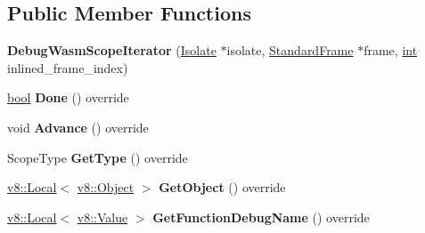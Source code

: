 \subsection*{Public Member Functions}
\begin{DoxyCompactItemize}
\item 
\mbox{\label{classv8_1_1internal_1_1DebugWasmScopeIterator_a8f3a1a31651d144344c15e9bd7116ba0}} 
{\bfseries Debug\+Wasm\+Scope\+Iterator} (\mbox{\hyperlink{classv8_1_1internal_1_1Isolate}{Isolate}} $\ast$isolate, \mbox{\hyperlink{classv8_1_1internal_1_1StandardFrame}{Standard\+Frame}} $\ast$frame, \mbox{\hyperlink{classint}{int}} inlined\+\_\+frame\+\_\+index)
\item 
\mbox{\label{classv8_1_1internal_1_1DebugWasmScopeIterator_aaf15b8b80a6d29062273579ba4f8d8e5}} 
\mbox{\hyperlink{classbool}{bool}} {\bfseries Done} () override
\item 
\mbox{\label{classv8_1_1internal_1_1DebugWasmScopeIterator_a1ae485a1a8297172acf77f81ff4cb5f6}} 
void {\bfseries Advance} () override
\item 
\mbox{\label{classv8_1_1internal_1_1DebugWasmScopeIterator_a26af9ce29cb5f55c33717be5e669645b}} 
Scope\+Type {\bfseries Get\+Type} () override
\item 
\mbox{\label{classv8_1_1internal_1_1DebugWasmScopeIterator_a310e9400ffcebdc3e7faa7ce54cec9d4}} 
\mbox{\hyperlink{classv8_1_1Local}{v8\+::\+Local}}$<$ \mbox{\hyperlink{classv8_1_1Object}{v8\+::\+Object}} $>$ {\bfseries Get\+Object} () override
\item 
\mbox{\label{classv8_1_1internal_1_1DebugWasmScopeIterator_a5e45ee24da2e7bb346b169417875019d}} 
\mbox{\hyperlink{classv8_1_1Local}{v8\+::\+Local}}$<$ \mbox{\hyperlink{classv8_1_1Value}{v8\+::\+Value}} $>$ {\bfseries Get\+Function\+Debug\+Name} () override
\item 
\mbox{\label{classv8_1_1internal_1_1DebugWasmScopeIterator_aafa346923677b93fdb5e8d34c92aec53}} 

\end{DoxyCompactItemize}
